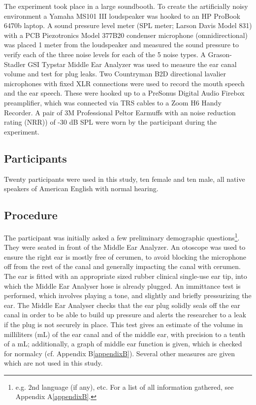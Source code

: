 \documentclass[dissertation,copyright]{uathesis}
\begin{document}
The experiment took place in a large soundbooth.  To create the artificially noisy environment a Yamaha MS101 III loudspeaker was hooked to an HP ProBook 6470b laptop.  A sound pressure level meter (SPL meter; Larson Davis Model 831) with a PCB Piezotronics Model 377B20 condenser microphone (omnidirectional) was placed 1 meter from the loudspeaker and measured the sound pressure to verify each of the three noise levels for each of the 5 noise types. A Grason-Stadler GSI Typstar Middle Ear Analyzer was used to measure the ear canal volume and test for plug leaks.  Two Countryman B2D directional lavalier microphones with fixed XLR connections were used to record the mouth speech and the ear speech.  These were hooked up to a PreSonus Digital Audio Firebox preamplifier, which was connected via TRS cables to a Zoom H6 Handy Recorder. A pair of 3M Professional Peltor Earmuffs with an noise reduction rating (NRR)) of -30 dB SPL were worn by the participant during the experiment.


\subsection{Participants}
Twenty participants were used in this study, ten female and ten male, all native speakers of American English with normal hearing.

\subsection{Procedure}

The participant was initially asked a few preliminary demographic questions\footnote{e.g. 2nd language (if any), etc. For a list of all information gathered, see Appendix A\ref{appendixB}.}. They were seated in front of the Middle Ear Analyzer.  An otoscope was used to ensure the right ear is mostly free of cerumen, to avoid blocking the microphone off from the rest of the canal and generally impacting the canal with cerumen.  The ear is fitted with an appropriate sized rubber clinical single-use ear tip, into which the Middle Ear Analyser hose is already plugged.  An immittance test is performed, which involves playing a tone, and slightly and briefly pressurizing the ear.  The Middle Ear Analyser checks that the ear plug solidly seals off the ear canal in order to be able to build up pressure and alerts the researcher to a leak if the plug is not securely in place.  This test gives an estimate of the volume in milliliters (mL) of the ear canal and of the middle ear, with precision to a tenth of a mL; additionally, a graph of middle ear function is given, which is checked for normalcy (cf. Appendix B\ref{appendixB}).  Several other measures are given which are not used in this study.
\end{document}
